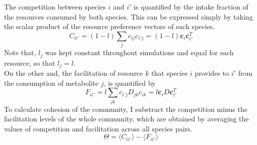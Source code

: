\documentclass[12pt]{article}
\begin{document}
	The competition between species $ i $ and $ i' $ is quantified by the intake fraction of the resources consumed by both species. This can be expressed simply by taking the scalar product of the resource preference vectors of each species. 
	\begin{equation}
		C_{ii'} = (1- l)\sum_{j}c_{ij}c_{i'j} =  (1-l) \boldsymbol{c}_i\boldsymbol{c}^T_{i'}
	\end{equation}
	Note that, $ l_j $ was kept constant throughout simulations and equal for each resource, so that $ l_j = l $.\\
	On the other and, the facilitation of resource $ k $ that species $ i $ provides to $ i' $ from the consumption of metabolite $ j $, is quantified by 
	\begin{equation}
	    F_{ii'} = l\sum_{jk}c_{i'j}D_{jk}c_{ik} = l\boldsymbol{c}_iD\boldsymbol{c}_{i'}^T
	\end{equation}
	To calculate cohesion of the community, I substract the competition minus the facilitation levels of the whole community, which are obtained by averaging the values of competition and facilitation across all species pairs.
	\begin{equation}
	    \Theta = \langle C_{ii'} \rangle - \langle F_{ii'} \rangle
	\end{equation}

	\newpage
	
	
\end{document}
